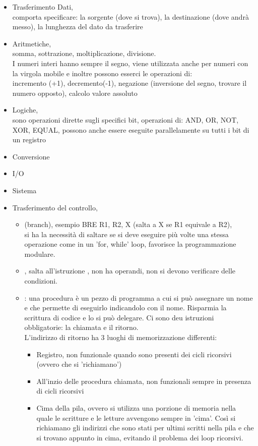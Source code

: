 \documentclass[arch.tex]{subfiles}
\begin{document}
\begin{itemize}
	\item Trasferimento Dati,\\
		comporta specificare: la sorgente (dove si trova), 
		la destinazione (dove andrà messo),
		la lunghezza del dato da trasferire
	\item Aritmetiche,\\
		somma, sottrazione, moltiplicazione, divisione.\\
		I numeri interi hanno sempre il segno, viene utilizzata anche per numeri con la virgola mobile e inoltre
		possono esserci le operazioni di:\\
		incremento (+1), decremento(-1), negazione (inversione del segno, trovare il numero opposto), calcolo valore 
		assoluto
	\item Logiche,\\
		sono operazioni dirette sugli specifici bit, operazioni di: AND, OR, NOT, XOR, EQUAL,
		possono anche essere eseguite parallelamente su tutti i bit di un registro
	\item Conversione
	\item I/O
	\item Sistema
	\item Trasferimento del controllo,
		\begin{itemize}
		\item {} (branch), esempio BRE R1, R2, X 
		(salta a X se R1 equivale a R2),\\
		si ha la necessità di saltare se si deve eseguire 
		più volte una stessa operazione come in 
		un 'for, while' loop, favorisce la programmazione modulare.
		\item	{}, salta all'istruzione  , 
		non ha operandi, non si devono verificare  delle condizioni.
		\item {}: una procedura è un pezzo di 
		programma a cui si può assegnare un nome e che permette di eseguirlo
		indicandolo con il nome. Risparmia la scrittura di codice e lo si può
		delegare. Ci sono deu istruzioni obbligatorie: la chiamata e il ritorno.\\
		L'indirizzo di ritorno ha 
		3 luoghi di memorizzazione differenti:

			\begin{itemize}
			\item Registro, non funzionale quando sono presenti 
				dei cicli ricorsivi (ovvero che si 'richiamano')
			\item All'inzio delle procedura chiamata, 
				non funzionali sempre in presenza di cicli ricorsivi
			\item Cima della pila, ovvero si utilizza una porzione di 
				memoria nella quale le scritture e le letture
				avvengono sempre in 'cima'. Così si richiamano 
				gli indirizzi che sono stati per ultimi scritti
				nella pila e che si trovano appunto in cima, 
				evitando il problema dei loop ricorsivi.
			\end{itemize}
		\end{itemize}
	\end{itemize}
\end{document}
